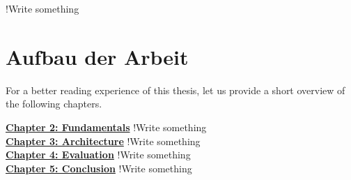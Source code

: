 !Write something
\section{Aufbau der Arbeit}
\label{sec:structure}
For a better reading experience of this thesis, let us provide a short overview of the following chapters.

\hyperref[chap:fundamentals]{\textbf{Chapter 2: Fundamentals}} !Write something\\
\hyperref[chap:architecture]{\textbf{Chapter 3: Architecture}} !Write something\\
\hyperref[chap:evaluation]{\textbf{Chapter 4: Evaluation}} !Write something\\
\hyperref[chap:conclusion]{\textbf{Chapter 5: Conclusion}} !Write something